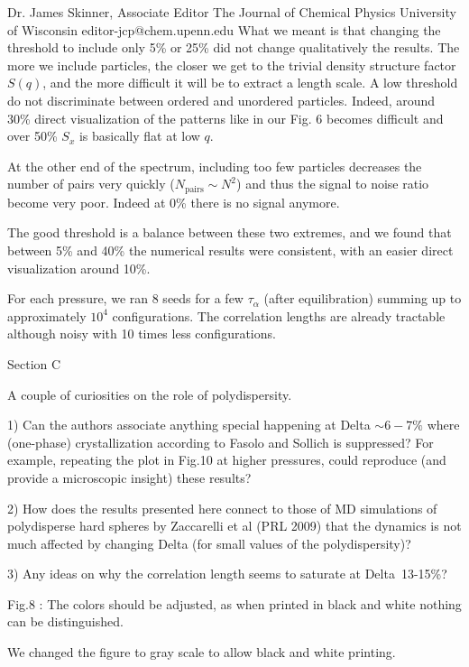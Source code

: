\documentclass[a4paper, rebuttal, parskip=true, firsthead=false, fromemail=true, foldmarks=false]{scrlttr2}
\begin{document}
\begin{letter}{Dr. James Skinner, Associate Editor
The Journal of Chemical Physics
University of Wisconsin
editor-jcp@chem.upenn.edu }
What we meant is that changing the threshold to include only 5\% or 25\% did not change qualitatively the results. The more we include particles, the closer we get to the trivial density structure factor $S(q)$, and the more difficult it will be to extract a length scale. A low threshold do not discriminate between ordered and unordered particles. Indeed, around 30\% direct visualization of the patterns like in our Fig. 6 becomes difficult and over 50\% $S_x$ is basically flat at low $q$. 

At the other end of the spectrum, including too few particles decreases the number of pairs very quickly ($N_\text{pairs}\sim N^2$) and thus the signal to noise ratio become very poor. Indeed at 0\% there is no signal anymore.

The good threshold is a balance between these two extremes, and we found that between 5\% and 40\% the numerical results were consistent, with an easier direct visualization around 10\%.

For each pressure, we ran 8 seeds for a few $\tau_\alpha$ (after equilibration) summing up to approximately $10^4$ configurations. The correlation lengths are already tractable although noisy with 10 times less configurations.

\begin{quotationi}
Section C

A couple of curiosities on the role of polydispersity.

1) Can the authors associate anything special happening at Delta $\sim6-7\%$ where (one-phase) crystallization according to Fasolo and Sollich is suppressed? For example, repeating the plot in Fig.10 at higher pressures, could reproduce (and provide a microscopic insight) these results?
\end{quotationi}

\begin{quotationi}
2) How does the results presented here connect to those of MD simulations of polydisperse hard spheres by Zaccarelli et al (PRL 2009) that the dynamics is not much affected by changing Delta (for small values of the polydispersity)?
\end{quotationi}

\begin{quotationi}
3) Any ideas on why the correlation length seems to saturate at Delta~13-15\%?
\end{quotationi}

\begin{quotationi}
Fig.8 : The colors should be adjusted, as when printed in black and white nothing can be distinguished.
\end{quotationi}
We changed the figure to gray scale to allow black and white printing.


\end{letter}
\end{document}
